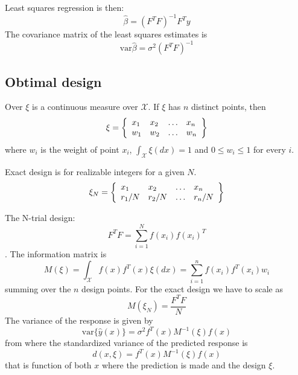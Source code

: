\documentclass[12pt]{iopart}
\begin{document}
Least squares regression is then:
\begin{equation}
\hat \beta = (F^T F)^{-1} F^T y
\end{equation}
The covariance matrix of the least squares estimates is
\begin{equation}
\mathrm{var} \hat \beta = \sigma^2 (F^T F)^{-1}
\end{equation}


\subsection{Obtimal design}
Over $\xi$ is a continuous measure over $\mathcal{X}$. If $\xi$ has $n$ distinct points, then
\begin{equation}
\xi = \left\{ 
  \begin{array}{l l l l}
    x_1 & x_2 & \ldots & x_n\\
    w_1 & w_2 & \ldots & w_n\\
  \end{array} \right \}
\end{equation}
where $w_i$ is the weight of point $x_i$, $\int_{\mathcal{X}}\xi(dx) = 1$ and $0 \leq w_i \leq 1$ for every $i$.

Exact design is for realizable integers for a given $N$.
\begin{equation}
\xi_N = \left\{ 
  \begin{array}{l l l l}
    x_1 & x_2 & \ldots & x_n\\
    r_1/N & r_2/N & \ldots & r_n/N\\
  \end{array} \right \}
\end{equation}

The N-trial design:
\begin{equation}
F^T F = \sum_{i=1}^N f(x_i) f(x_i)^T
\end{equation}.
The information matrix is
\begin{equation}
M(\xi) = \int_{\mathcal{X}} f(x)f^T(x) \xi(dx) = \sum_{i=1}^n f(x_i)f^T(x_i)w_i
\end{equation}
summing over the $n$ design points.
For the exact design we have to scale as
\begin{equation}
M(\xi_N) = \frac{F^T F}{N}
\end{equation}
The variance of the response is given by
\begin{equation}
\mathrm{var}\{\hat y(x)\} = \sigma^2 f^T(x) M^{-1}(\xi) f(x)
\end{equation}
from where the standardized variance of the predicted response is
\begin{equation}
d(x, \xi) = f^T(x) M^{-1}(\xi) f(x)
\end{equation}
that is function of both $x$ where the prediction is made and the design $\xi$.
\end{document}
